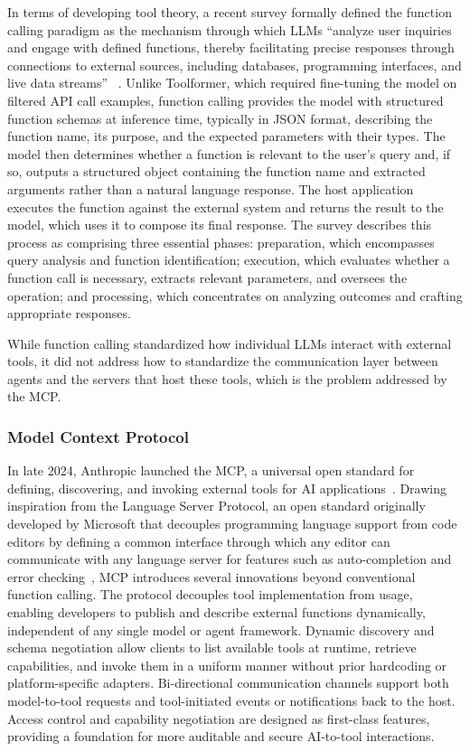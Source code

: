 \documentclass[
english,                 %
bibtex,                  %
includeExtraAbstracts, %
]{kththesis}
\numberwithin{listing}{chapter}
\begin{document}
In terms of developing tool theory, a recent survey formally defined the function calling paradigm as the mechanism through which \glspl{LLM} ``analyze user inquiries and engage with defined functions, thereby facilitating precise responses through connections to external sources, including databases, programming interfaces, and live data streams'' ~\cite{wang_function_2026}. Unlike Toolformer, which required fine-tuning the model on filtered \gls{API} call examples, function calling provides the model with structured function schemas at inference time, typically in \gls{JSON} format, describing the function name, its purpose, and the expected parameters with their types. The model then determines whether a function is relevant to the user's query and, if so, outputs a structured object containing the function name and extracted arguments rather than a natural language response. The host application executes the function against the external system and returns the result to the model, which uses it to compose its final response. The survey describes this process as comprising three essential phases: preparation, which encompasses query analysis and function identification; execution, which evaluates whether a function call is necessary, extracts relevant parameters, and oversees the operation; and processing, which concentrates on analyzing outcomes and crafting appropriate responses.

While function calling standardized how individual \glspl{LLM} interact with external tools, it did not address how to standardize the communication layer between agents and the servers that host these tools, which is the problem addressed by the \gls{MCP}.

\subsubsection{Model Context Protocol}

In late 2024, Anthropic launched the \gls{MCP}, a universal open standard for defining, discovering, and invoking external tools for \gls{AI} applications~\cite{hou_model_2026}. Drawing inspiration from the Language Server Protocol, an open standard originally developed by Microsoft that decouples programming language support from code editors by defining a common interface through which any editor can communicate with any language server for features such as auto-completion and error checking~\cite{gunasinghe_language_2021}, \gls{MCP} introduces several innovations beyond conventional function calling. The protocol decouples tool implementation from usage, enabling developers to publish and describe external functions dynamically, independent of any single model or agent framework. Dynamic discovery and schema negotiation allow clients to list available tools at runtime, retrieve capabilities, and invoke them in a uniform manner without prior hardcoding or platform-specific adapters. Bi-directional communication channels support both model-to-tool requests and tool-initiated events or notifications back to the host. Access control and capability negotiation are designed as first-class features, providing a foundation for more auditable and secure \gls{AI}-to-tool interactions.
\end{document}
